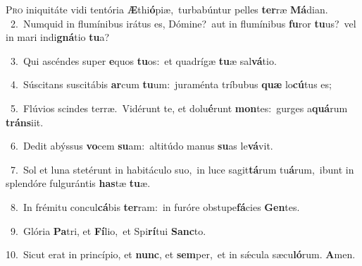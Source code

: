 \lettrine{\initial\textcolor{\initialcolor}{P}}{ro} iniquitáte vidi tentória \textbf{Æ}\-thi\-\textbf{ó}\-piæ,~\star turbabúntur pelles \textbf{ter}\-ræ \textbf{Má}\-dian.\\
{\numbfont\textcolor{\numbcolor}{~2.}}~Numquid in flumínibus irátus es, Dómine?~\dagger aut in flumínibus \textbf{fu}\-ror \textbf{tu}\-us?~\star vel in mari indi\-\textbf{gná}\-tio \textbf{tu}\-a?\par
{\numbfont\textcolor{\numbcolor}{~3.}}~Qui ascéndes super \textbf{e}\-quos \textbf{tu}\-os:~\star et quadrígæ \textbf{tu}\-æ sal\-\textbf{vá}\-tio.\par
{\numbfont\textcolor{\numbcolor}{~4.}}~Súscitans suscitábis \textbf{ar}\-cum \textbf{tu}\-um:~\star juraménta tríbubus \textbf{quæ} lo\-\textbf{cú}\-tus es;\par
{\numbfont\textcolor{\numbcolor}{~5.}}~Flúvios scindes terræ.~\dagger Vidérunt te, et dolu\-\textbf{é}\-runt \textbf{mon}\-tes:~\star gurges a\-\textbf{quá}\-rum \textbf{tráns}\-iit.\par
{\numbfont\textcolor{\numbcolor}{~6.}}~Dedit abýssus \textbf{vo}\-cem \textbf{su}\-am:~\star altitúdo manus \textbf{su}\-as le\-\textbf{vá}\-vit.\par
{\numbfont\textcolor{\numbcolor}{~7.}}~Sol et luna stetérunt in habitáculo suo,~\dagger in luce sagit\-\textbf{tá}\-rum tu\-\textbf{á}\-rum,~\star ibunt in splendóre fulgurántis \textbf{has}\-tæ \textbf{tu}\-æ.\par
{\numbfont\textcolor{\numbcolor}{~8.}}~In frémitu concul\-\textbf{cá}\-bis \textbf{ter}\-ram:~\star in furóre obstupe\-\textbf{fá}\-cies \textbf{Gen}\-tes.\par
{\numbfont\textcolor{\numbcolor}{~9.}}~Glória \textbf{Pa}\-tri, et \textbf{Fí}\-lio,~\star et Spi\-\textbf{rí}\-tui \textbf{Sanc}\-to.\par
{\numbfont\textcolor{\numbcolor}{10.}}~Sicut erat in princípio, et \textbf{nunc}\-, et \textbf{sem}\-per,~\star et in sǽcula sæcu\-\textbf{ló}\-rum. \textbf{A}\-men.\par

